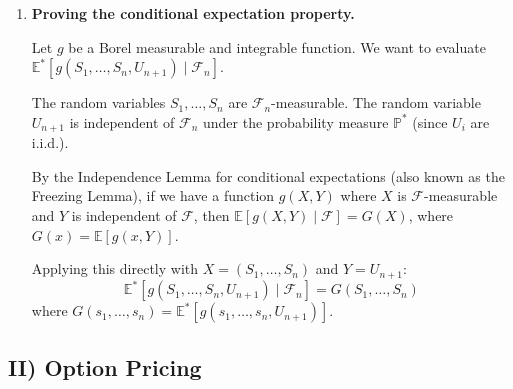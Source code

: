 \begin{enumerate}
            Since $S_n$ is $\mathcal{F}_n$-measurable, it can be taken out of the expectation:
            \[ \frac{S_n}{(1+r)^{n+1}} \mathbb{E}^*[U_{n+1} \mid \mathcal{F}_n] = \frac{S_n}{(1+r)^n} \implies \mathbb{E}^*[U_{n+1} \mid \mathcal{F}_n] = 1+r \]

            Let $p^* = \mathbb{P}^*(U_{n+1} = u \mid \mathcal{F}_n)$. Since $U_{n+1}$ only takes values $u$ and $d$:
            \[ p^* u + (1 - p^*) d = 1+r \]

            Solving for $p^*$:
            \[ p^*(u - d) + d = 1+r \implies p^* = \frac{1+r-d}{u-d} \]

            Under $\mathbb{P}^*$, the random variables $(U_n)_{n \in \{1, \dots, N\}}$ are independent and identically distributed (i.i.d.), each taking the value $u$ with probability $p^*$ and $d$ with probability $1 - p^*$.

      \item \textbf{Proving the conditional expectation property.}

            Let $g$ be a Borel measurable and integrable function. We want to evaluate $\mathbb{E}^*[g(S_1, \dots, S_n, U_{n+1}) \mid \mathcal{F}_n]$.

            The random variables $S_1, \dots, S_n$ are $\mathcal{F}_n$-measurable.
            The random variable $U_{n+1}$ is independent of $\mathcal{F}_n$ under the probability measure $\mathbb{P}^*$ (since $U_i$ are i.i.d.).

            By the Independence Lemma for conditional expectations (also known as the Freezing Lemma), if we have a function $g(X, Y)$ where $X$ is $\mathcal{F}$-measurable and $Y$ is independent of $\mathcal{F}$, then $\mathbb{E}[g(X,Y) \mid \mathcal{F}] = G(X)$, where $G(x) = \mathbb{E}[g(x,Y)]$.

            Applying this directly with $X = (S_1, \dots, S_n)$ and $Y = U_{n+1}$:
            \[ \mathbb{E}^*[g(S_1, \dots, S_n, U_{n+1}) \mid \mathcal{F}_n] = G(S_1, \dots, S_n) \]
            where $G(s_1, \dots, s_n) = \mathbb{E}^*[g(s_1, \dots, s_n, U_{n+1})]$.

\end{enumerate}

\subsection{II) Option Pricing}

